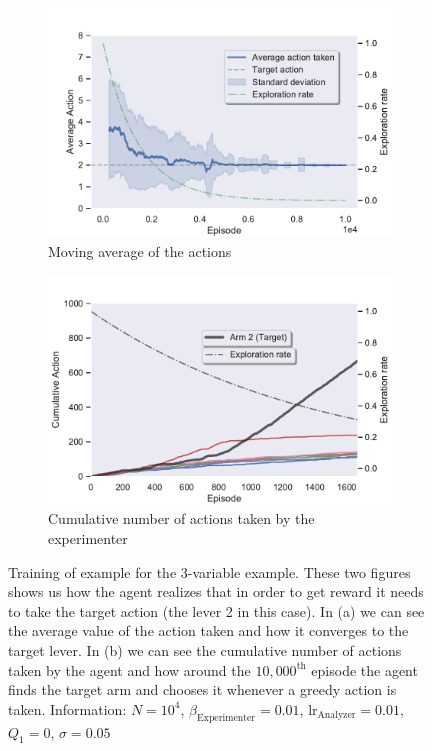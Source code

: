 \documentclass[11pt,a4paper,twoside]{report}
\newcommand{\+}{\textnormal{+} }
\theoremstyle{definition}
\numberwithin{equation}{chapter}
\begin{document}
    \begin{figure}[]
      \centering
      \begin{subfigure}{.5\textwidth}
        \centering
        \includegraphics[width=1\linewidth]{figures/Actions-MAB4.pdf}
        \caption{Moving average of the actions}
        \label{fig:ActionAverageMAB4}
      \end{subfigure}%
      \begin{subfigure}{.5\textwidth}
        \centering
        \includegraphics[width=1\linewidth]{figures/Cum-action-MAB4.pdf}
        \caption{Cumulative number of actions taken by the experimenter}
        \label{fig:actionsMAB4}
      \end{subfigure}
      \caption{Training of example for the 3-variable example. These two figures
      shows us how the agent realizes that in order to get reward it needs to
      take the target action (the lever 2 in this case). In (a) we can see the
      average value of the action taken and how it converges to the target
      lever. In (b) we can see the
      cumulative number of actions taken by the agent and how around the
      $10,000^\text{th}$ episode the agent finds the target arm and chooses it
      whenever a greedy action is taken. Information: $N=10^4$,
      $\beta_\text{Experimenter}=0.01$, $\text{lr}_\text{Analyzer}=0.01$,
      $Q_1=0$, $\sigma=0.05$}
    \end{figure}
\end{document}

